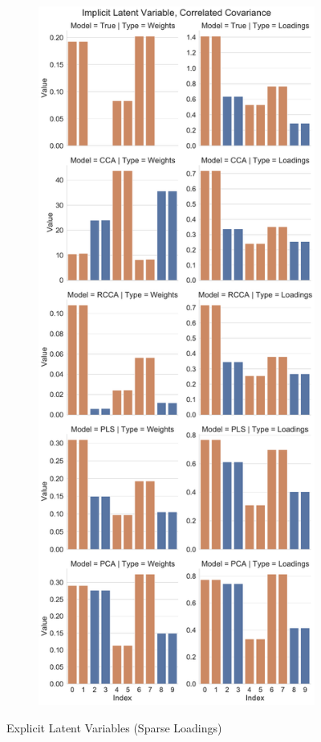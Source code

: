 \begin{figure}
\begin{subfigure}{0.49\linewidth}
\end{subfigure}
%
\begin{subfigure}{0.49\linewidth}
\centering
\includegraphics[width=\linewidth]{figures/simulated/Combined_Weights_Loadings_with_Error_Bars_Correlated_Covariance_implicit.pdf}
\end{subfigure}
    \caption{Explicit Latent Variables (Sparse Loadings)}\label{fig:explicit-sparse-loadings}
\end{figure}

